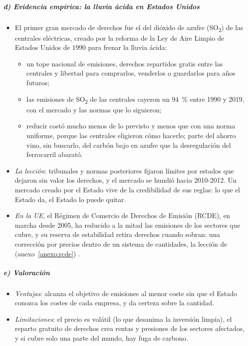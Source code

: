 \documentclass[11pt]{article}
\begin{document}
\subparagraph{d) Evidencia empírica: la lluvia ácida en Estados Unidos}
\begin{itemize}
\item El primer gran mercado de derechos fue el del dióxido de azufre (SO\textsubscript{2}) de las centrales eléctricas, creado por la reforma de la Ley de Aire Limpio de Estados Unidos de 1990 para frenar la lluvia ácida\nocite{SchmalenseeStavins2013}:
  \begin{itemize}
  \item un tope nacional de emisiones, derechos repartidos gratis entre las centrales y libertad para comprarlos, venderlos o guardarlos para años futuros;
  \item las emisiones de SO\textsubscript{2} de las centrales cayeron un 94~\% entre 1990 y 2019, con el mercado y las normas que lo siguieron\nocite{LaCount2021Reducing};
  \item reducir costó mucho menos de lo previsto y menos que con una norma uniforme, porque las centrales eligieron cómo hacerlo; parte del ahorro vino, sin buscarlo, del carbón bajo en azufre que la desregulación del ferrocarril abarató\nocite{SchmalenseeStavins2013}.
  \end{itemize}
\item \emph{La lección}: tribunales y normas posteriores fijaron límites por estados que dejaron sin valor los derechos, y el mercado se hundió hacia 2010-2012. Un mercado creado por el Estado vive de la credibilidad de sus reglas: lo que el Estado da, el Estado lo puede quitar\nocite{SchmalenseeStavins2013}.
\item \emph{En la UE}, el Régimen de Comercio de Derechos de Emisión (RCDE), en marcha desde 2005, ha reducido a la mitad las emisiones de los sectores que cubre, y su reserva de estabilidad retira derechos cuando sobran: una corrección por precios dentro de un sistema de cantidades, la lección de  (anexo~\ref{anexo:rcde}) .
\end{itemize}

\subparagraph{e) Valoración}
\begin{itemize}
\item \emph{Ventajas}: alcanza el objetivo de emisiones al menor coste sin que el Estado conozca los costes de cada empresa, y da certeza sobre la cantidad.
\item \emph{Limitaciones}: el precio es volátil (lo que desanima la inversión limpia), el reparto gratuito de derechos crea rentas y presiones de los sectores afectados, y si cubre solo una parte del mundo, hay fuga de carbono.
\end{itemize}
\end{document}
